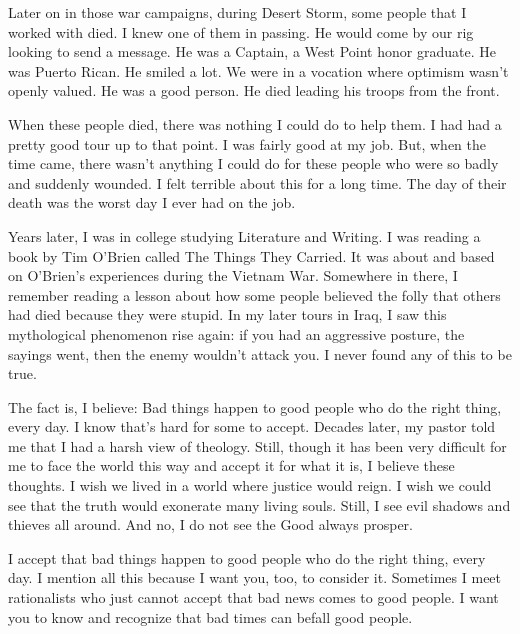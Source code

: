 Later on in those war campaigns, during Desert Storm, some people that I worked with died.  I knew one of them in passing.  He would come by our rig looking to send a message.  He was a Captain, a West Point honor graduate.  He was Puerto Rican.  He smiled a lot.  We were in a vocation where optimism wasn't openly valued.  He was a good person.  He died leading his troops from the front.

When these people died, there was nothing I could do to help them.  I had had a pretty good tour up to that point.  I was fairly good at my job.  But, when the time came, there wasn't anything I could do for these people who were so badly and suddenly wounded.  I felt terrible about this for a long time.  The day of their death was the worst day I ever had on the job.

Years later, I was in college studying Literature and Writing.  I was reading a book by Tim O'Brien called The Things They Carried.  It was about and based on O'Brien's experiences during the Vietnam War.  Somewhere in there, I remember reading a lesson about how some people believed the folly that others had died because they were stupid.  In my later tours in Iraq, I saw this mythological phenomenon rise again:  if you had an aggressive posture, the sayings went, then the enemy wouldn't \gls{attack} you.  I never found any of this to be true.

The fact is, I believe:  Bad things happen to good people who do the right thing, every day.  I know that's hard for some to accept.  Decades later, my pastor told me that I had a harsh view of theology.  Still, though it has been very difficult for me to face the world this way and accept it for what it is, I believe these thoughts.  I wish we lived in a world where justice would reign.  I wish we could see that the truth would exonerate many living souls.  Still, I see evil shadows and thieves all around.  And no, I do not see the Good always prosper.

I accept that bad things happen to good people who do the right thing, every day.  I mention all this because I want you, too, to consider it.  Sometimes I meet rationalists who just cannot accept that bad news comes to good people.  I want you to know and recognize that bad times can befall good people.


